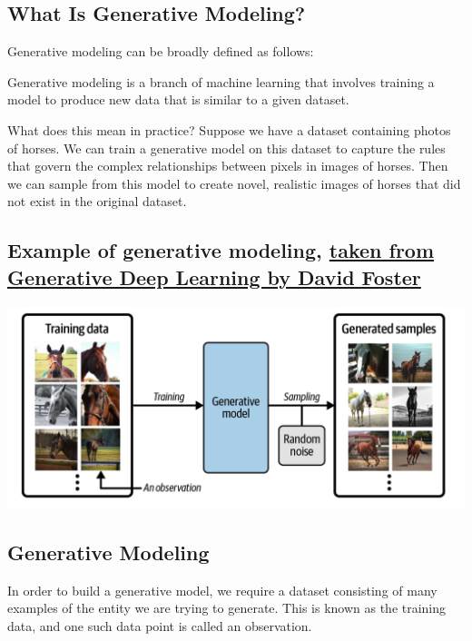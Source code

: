 \documentclass[%
oneside,                 %
final,                   %
10pt]{article}
\begin{document}
\noindent
\subsection{What Is Generative Modeling?}

Generative modeling can be broadly defined as follows:

Generative modeling is a branch of machine learning that involves
training a model to produce new data that is similar to a given
dataset.

What does this mean in practice? Suppose we have a dataset containing
photos of horses. We can train a generative model on this dataset to
capture the rules that govern the complex relationships between pixels
in images of horses. Then we can sample from this model to create
novel, realistic images of horses that did not exist in the original
dataset. 

\subsection{Example of generative modeling, \href{{https://www.oreilly.com/library/view/generative-deep-learning/9781098134174/ch01.html}}{taken from Generative Deep Learning by David Foster}}

\vspace{6mm}

\centerline{\includegraphics[width=1.0\linewidth]{figures/generativelearning.png}}

\vspace{6mm}

\subsection{Generative Modeling}

In order to build a generative model, we require a dataset consisting
of many examples of the entity we are trying to generate. This is
known as the training data, and one such data point is called an
observation.
\end{document}
